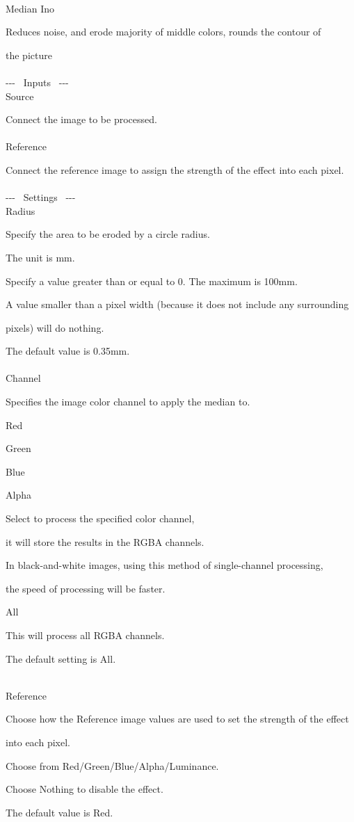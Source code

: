 \documentclass[a4paper,12pt]{article}
\begin{document}
\thispagestyle{empty}

\Large
\noindent \\
Median Ino\medskip
\par
\normalsize
Reduces noise, and erode majority of middle colors, rounds the contour of\par 
the picture\\
\\
-{-}- \ Inputs \ -{-}-\\
Source\par
Connect the image to be processed.\\
\\
Reference\par
Connect the reference image to assign the strength of the effect into each pixel.\\
\\
-{-}- \ Settings \ -{-}-\\
Radius\par
Specify the area to be eroded by a circle radius.\par
The unit is mm.\\
\par
Specify a value greater than or equal to 0. The maximum is 100mm.\par
A value smaller than a pixel width (because it does not include any surrounding\par 
pixels) will do nothing.\\
\par
The default value is 0.35mm.\\
\\
Channel\par
Specifies the image color channel to apply the median to.\\
\par
\textquotedbl Red\textquotedbl\par
\textquotedbl Green\textquotedbl\par
\textquotedbl Blue\textquotedbl\par
\textquotedbl Alpha\textquotedbl\par
Select to process the specified color channel,\par
it will store the results in the RGBA channels.\par
In black-and-white images, using this method of single-channel processing,\par
the speed of processing will be faster.\\
\par
\textquotedbl All\textquotedbl\par
This will process all RGBA channels.\\
\par
The default setting is \textquotedbl All\textquotedbl .\\
\newpage

\thispagestyle{empty}

\ \vspace{-0.2em}
\\
Reference\par
Choose how the Reference image values are used to set the strength of the effect\par 
into each pixel.\par
Choose from Red/Green/Blue/Alpha/Luminance.\par
Choose Nothing to disable the effect.\par
The default value is Red.
\end{document}

